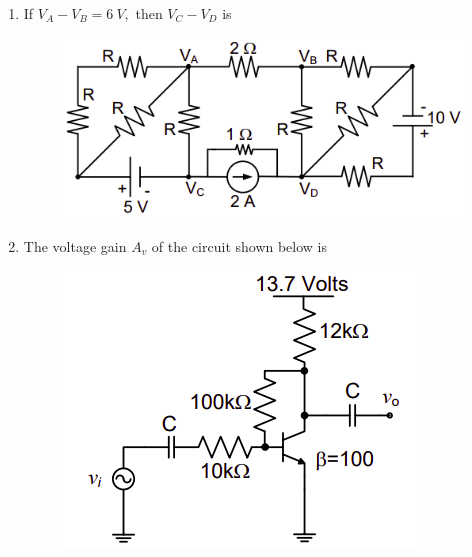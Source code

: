 \documentclass[journal,12pt,onecolumn]{IEEEtran}
\theoremstyle{remark}
\begin{document}
\begin{enumerate}[start=1, label=Q.\arabic*]
\item If $V_{A}-V_{B}=6~V,$ then $V_{C}-V_{D}$ is
\begin{figure}[H]
    \centering
    \includegraphics[width=0.6\columnwidth]{Figures/q28.png}
    \caption{}
\end{figure}

\begin{enumerate}
\end{enumerate}
\hfill{}

\item The voltage gain $A_{v}$ of the circuit shown below is
\begin{figure}[H]
    \centering
    \includegraphics[width=0.4\columnwidth]{Figures/q29.png}
    \caption{}
\end{figure}


\end{enumerate}
\end{document}
